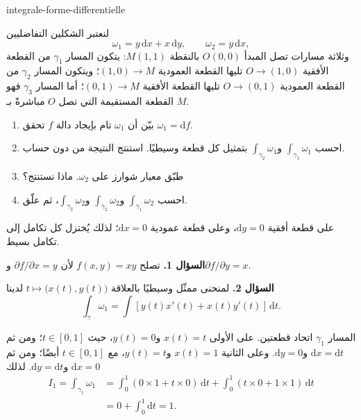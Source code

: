 
\begin{exo}{integrale-forme-differentielle}

لنعتبر الشكلين التفاضليين
\[
\omega_1 = y\,\mathrm{d}x + x\,\mathrm{d}y,
\qquad
\omega_2 = y\,\mathrm{d}x,
\]
وثلاثة مسارات تصل المبدأ $O(0,0)$ بالنقطة $M(1,1)$: يتكون المسار
$\gamma_1$ من القطعة الأفقية $O\to(1,0)$ تليها القطعة العمودية
$(1,0)\to M$؛ ويتكون المسار $\gamma_2$ من القطعة العمودية $O\to(0,1)$
تليها القطعة الأفقية $(0,1)\to M$؛ أما المسار $\gamma_3$ فهو القطعة المستقيمة
التي تصل $O$ مباشرةً بـ $M$.

\begin{enumerate}
\item بيّن أن $\omega_1$ تام بإيجاد دالة $f$ تحقق $\omega_1=\mathrm{d}f$.
\item احسب $\int_{\gamma_1}\omega_1$ و$\int_{\gamma_2}\omega_1$ بتمثيل كل قطعة وسيطيًا. استنتج النتيجة من دون حساب.
\item طبّق معيار شوارز على $\omega_2$. ماذا نستنتج؟
\item احسب $\int_{\gamma_1}\omega_2$ و$\int_{\gamma_2}\omega_2$ و$\int_{\gamma_3}\omega_2$، ثم علّق.
\end{enumerate}

\begin{indication}
على قطعة أفقية $\mathrm{d}y=0$، وعلى قطعة عمودية $\mathrm{d}x=0$؛ لذلك
يُختزل كل تكامل إلى تكامل بسيط.
\end{indication}

\begin{solution}
\textbf{السؤال 1.} تصلح $f(x,y)=xy$ لأن $\partial f/\partial x=y$ و$\partial f/\partial y=x$.

\textbf{السؤال 2.} لمنحنى ممثّل وسيطيًا بالعلاقة
$t\mapsto\bigl(x(t),y(t)\bigr)$ لدينا
\[
\int_\gamma\omega_1
= \int \left[y(t)x'(t)+x(t)y'(t)\right]\,\mathrm{d}t.
\]

المسار $\gamma_1$ اتحاد قطعتين. على الأولى $x(t)=t$ و$y(t)=0$، حيث
$t\in[0,1]$؛ ومن ثم $\mathrm{d}x=\mathrm{d}t$ و$\mathrm{d}y=0$.
وعلى الثانية $x(t)=1$ و$y(t)=t$، مع $t\in[0,1]$ أيضًا؛ ومن ثم
$\mathrm{d}x=0$ و$\mathrm{d}y=\mathrm{d}t$. لذلك
\[
\begin{aligned}
I_1
= \int_{\gamma_1}\omega_1
&= \int_0^1\left(0\times 1+t\times 0\right)\,\mathrm{d}t
 + \int_0^1\left(t\times 0+1\times 1\right)\,\mathrm{d}t \\
&= 0+\int_0^1\mathrm{d}t = 1.
\end{aligned}
\]


\end{solution}
\end{exo}
